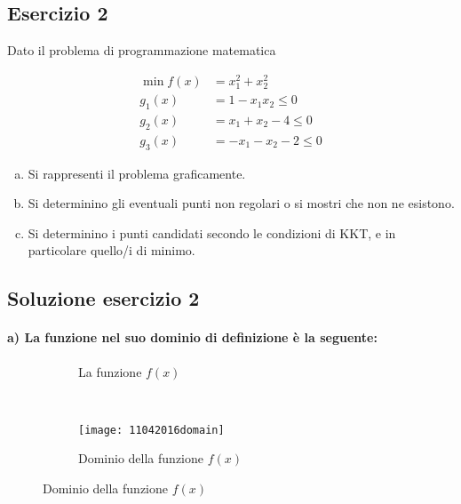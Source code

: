 \documentclass[\main/main.tex]{subfiles}
\begin{document}
\subsection{Esercizio 2}
Dato il problema di programmazione matematica

\begin{align*}
  \min f(x) & =x^2_1+x^2_2           \\
  g_1(x)    & = 1-x_1x_2 \leq 0      \\
  g_2(x)    & = x_1 + x_2 -4 \leq 0  \\
  g_3(x)    & = -x_1 - x_2 - 2\leq 0
\end{align*}

\begin{enumerate}[a)]
  \item Si rappresenti il problema graficamente.
  \item Si determinino gli eventuali punti non regolari o si mostri che non ne esistono.
  \item Si determinino i punti candidati secondo le condizioni di KKT, e in particolare quello/i di minimo.
\end{enumerate}

\subsection{Soluzione esercizio 2}

\paragraph*{a) La funzione nel suo dominio di definizione è la seguente:}

\begin{figure}
  \begin{subfigure}{0.45\textwidth}
    \caption{La funzione $f(x)$}
  \end{subfigure}
  ~
  \begin{subfigure}{0.45\textwidth}
    \texttt{[image: 11042016domain]}
    \caption{Dominio della funzione $f(x)$}
  \end{subfigure}
\end{figure}
\end{document}
